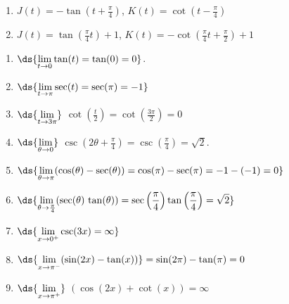 \documentclass{ximera}
\begin{document}
\begin{multicols}{2}
\begin{enumerate}
\setcounter{enumi}{\value{HW}}

\item  $J(t) = -\tan\left(t+ \frac{\pi}{4} \right)$, $K(t) = \cot  \left(t - \frac{\pi}{4} \right)$

\item  $J(t) = \tan\left( \frac{\pi}{4} t \right) + 1$, $K(t) = -\cot\left( \frac{\pi}{4} t + \frac{\pi}{2} \right) + 1$

\setcounter{HW}{\value{enumi}}
\end{enumerate}
\end{multicols}


\begin{enumerate}
\setcounter{enumi}{\value{HW}}

\item $\ds{\lim_{t \rightarrow 0} \tan(t) = \tan(0) = 0}$.

\item $\ds{\lim_{t \rightarrow \pi} \sec(t) = \sec(\pi) = -1}$

\item $\ds{\lim_{t \rightarrow 3\pi}}$ $\cot\left(\frac{t}{2}\right) = \cot\left(\frac{3\pi}{2}\right) = 0$

\item  $\ds{\lim_{\theta \rightarrow 0}}$ $\csc\left(2\theta + \frac{\pi}{4}\right) = \csc\left(\frac{\pi}{4}\right) = \sqrt{2}$.

\item $\ds{\lim_{\theta \rightarrow \pi} (\cos(\theta)  -  \sec(\theta)) = \cos(\pi) - \sec(\pi) = -1 - (-1) = 0}$

\item $\ds{\lim_{\theta \rightarrow \frac{\pi}{4}} (\sec(\theta) \, \tan(\theta)) = \sec\left( \frac{\pi}{4} \right) \tan\left( \frac{\pi}{4} \right) = \sqrt{2}}$

\item  $\ds{\lim_{x \rightarrow 0^{+}} \csc(3x) = \infty}$

\item $\ds{\lim_{x \rightarrow \pi^{-}}  (\sin(2x)  - \tan(x))}  = \sin(2\pi) - \tan(\pi) = 0$

\item $\ds{\lim_{x \rightarrow \pi^{+}}}$ $(\cos(2x) + \cot(x)) =  \infty$

\setcounter{HW}{\value{enumi}}
\end{enumerate}
\end{document}
